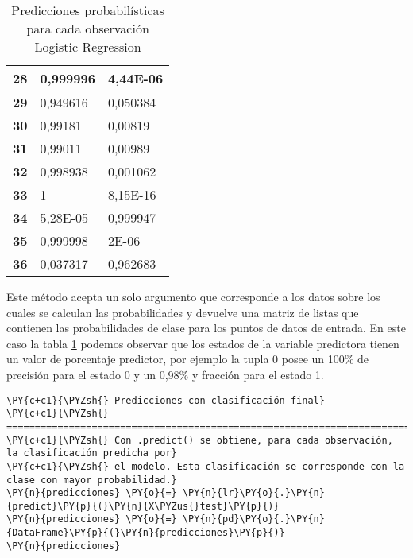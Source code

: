 \begin{table}[H]
{\begin{tabular}{|c|l|l|}
\textbf{28} & 0,999996 & 4,44E-06 \\ \hline
\textbf{29} & 0,949616 & 0,050384 \\ \hline
\textbf{30} & 0,99181 & 0,00819 \\ \hline
\textbf{31} & 0,99011 & 0,00989 \\ \hline
\textbf{32} & 0,998938 & 0,001062 \\ \hline
\textbf{33} & 1 & 8,15E-16 \\ \hline
\textbf{34} & 5,28E-05 & 0,999947 \\ \hline
\textbf{35} & 0,999998 & 2E-06 \\ \hline
\textbf{36} & 0,037317 & 0,962683 \\ \hline
\end{tabular}%
}
\caption{Predicciones probabilísticas para cada observación Logistic Regression}
\label{tab:clasificacin lr}
\end{table}
        
    Este método acepta un solo argumento que corresponde a los datos sobre
los cuales se calculan las probabilidades y devuelve una matriz de
listas que contienen las probabilidades de clase para los puntos de
datos de entrada. En este caso la tabla \ref{tab:clasificacin lr} podemos observar que los
estados de la variable predictora tienen un valor de porcentaje
predictor, por ejemplo la tupla 0 posee un 100\% de precisión para el
estado 0 y un 0,98\% y fracción para el estado 1.

    \begin{tcolorbox}[breakable, size=fbox, boxrule=1pt, pad at break*=1mm,colback=cellbackground, colframe=cellborder]
\begin{Verbatim}[commandchars=\\\{\}]
\PY{c+c1}{\PYZsh{} Predicciones con clasificación final}
\PY{c+c1}{\PYZsh{} ==============================================================================}
\PY{c+c1}{\PYZsh{} Con .predict() se obtiene, para cada observación, la clasificación predicha por}
\PY{c+c1}{\PYZsh{} el modelo. Esta clasificación se corresponde con la clase con mayor probabilidad.}
\PY{n}{predicciones} \PY{o}{=} \PY{n}{lr}\PY{o}{.}\PY{n}{predict}\PY{p}{(}\PY{n}{X\PYZus{}test}\PY{p}{)}
\PY{n}{predicciones} \PY{o}{=} \PY{n}{pd}\PY{o}{.}\PY{n}{DataFrame}\PY{p}{(}\PY{n}{predicciones}\PY{p}{)}
\PY{n}{predicciones}
\end{Verbatim}
\end{tcolorbox}

